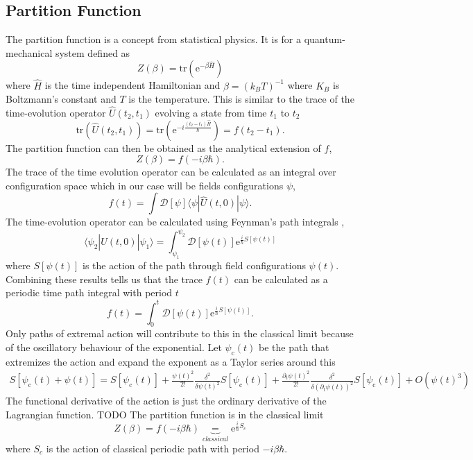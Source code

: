 \documentclass[12pt]{book}
\newcommand{\e}{\ensuremath{\mathrm{e}}}
\renewcommand{\i}{\ensuremath{i}}
\newcommand{\ket}[1]{|#1\rangle}
\newcommand{\bra}[1]{\langle#1|}
\newcommand{\bracket}[3]{\bra{#1}#2\ket{#3}}
\begin{document}
\subsection{Partition Function}
The partition function is a concept from statistical physics. It is for a quantum-mechanical system defined as
\begin{equation}
 Z(\beta)=\mathrm{tr}(\e^{-\beta\hat{H}})
\end{equation}
where $\hat{H}$ is the time independent Hamiltonian and $\beta=(k_BT)^{-1}$ where $K_B$ is Boltzmann's constant and $T$ is the temperature. This is similar to the trace of the time-evolution operator $\hat{U}(t_2,t_1)$ evolving a state from time $t_1$ to $t_2$
\begin{equation}
 \mathrm{tr}(\hat{U}(t_2,t_1))=\mathrm{tr}(\e^{-\i\frac{(t_2-t_1)\hat{H}}{\hbar}})=f(t_2-t_1).
\end{equation}
The partition function can then be obtained as the analytical extension of $f$,
\begin{equation}
 Z(\beta)=f(-\i\beta\hbar).
\end{equation}
The trace of the time evolution operator can be calculated as an integral over configuration space which in our case will be fields configurations $\psi$,
\begin{equation}
 f(t)=\int \mathcal{D}[\psi] \bracket{\psi}{\hat{U}(t,0)}{\psi}.
\end{equation}
The time-evolution operator can be calculated using Feynman's path integrals \cite{feynman1965quantum},
\begin{equation}
 \bracket{\psi_2}{\hat{U}(t,0)}{\psi_1}=\int_{\psi_1}^{\psi_2} \mathcal{D}[\psi(t)]\e^{\frac{\i}{\hbar}S[\psi(t)]}
\end{equation}
where $S[\psi(t)]$ is the action of the path through field configurations $\psi(t)$. Combining these results tells us that the trace $f(t)$ can be calculated as a periodic time path integral with period $t$
\begin{equation}
 f(t)=\int_0^t \mathcal{D}[\psi(t)]\e^{\frac{\i}{\hbar}S[\psi(t)]}.
\end{equation}
Only paths of extremal action will contribute to this in the classical limit because of the oscillatory behaviour of the exponential. Let $\psi_\mathrm{c}(t)$ be the path that extremizes the action and expand the exponent as a Taylor series around this
\begin{equation}
\begin{split}
 S[\psi_\mathrm{c}(t)+\psi(t)]=S[\psi_\mathrm{c}(t)]+\frac{\psi(t)^2}{2!}\frac{\delta^2}{\delta\psi(t)^2} S[\psi_\mathrm{c}(t)]+
\frac{\partial_t\psi(t)^2}{2!}\frac{\delta^2}{\delta(\partial_t\psi(t))^2} S[\psi_\mathrm{c}(t)]+O(\psi(t)^3)
\end{split}
\end{equation}
The functional derivative of the action is just the ordinary derivative of the Lagrangian function. TODO
The partition function is in the classical limit
\begin{equation}
 Z(\beta)=f(-\i\beta\hbar)\underbrace{=}_{classical} \e^{\frac{i}{\hbar}S_c}
\end{equation}
where $S_c$ is the action of classical periodic path with period $-\i\beta\hbar$.
\end{document}

